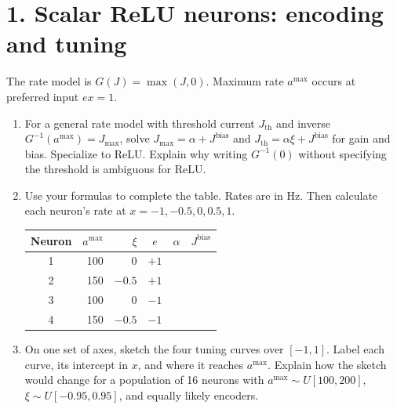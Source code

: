 \documentclass[11pt,letterpaper]{article}
\begin{document}
\section*{1. Scalar ReLU neurons: encoding and tuning}
The rate model is \(G(J)=\max(J,0)\). Maximum rate \(a^{\max}\) occurs at preferred input \(e x=1\).
\begin{enumerate}[label=\textbf{1\alph*.}]
\item For a general rate model with threshold current \(J_{\mathrm{th}}\) and inverse \(G^{-1}(a^{\max})=J_{\max}\), solve \(J_{\max}=\alpha+J^{\mathrm{bias}}\) and \(J_{\mathrm{th}}=\alpha\xi+J^{\mathrm{bias}}\) for gain and bias. Specialize to ReLU. Explain why writing \(G^{-1}(0)\) without specifying the threshold is ambiguous for ReLU.
\item Use your formulas to complete the table. Rates are in Hz. Then calculate each neuron's rate at \(x=-1,-0.5,0,0.5,1\).
\begin{center}\begin{tabular}{c r r c c c}\toprule
Neuron & \(a^{\max}\) & \(\xi\) & \(e\) & \(\alpha\) & \(J^{\mathrm{bias}}\)\\\midrule
1 & 100 & 0 & \(+1\) & & \\
2 & 150 & \(-0.5\) & \(+1\) & & \\
3 & 100 & 0 & \(-1\) & & \\
4 & 150 & \(-0.5\) & \(-1\) & & \\
\bottomrule\end{tabular}\end{center}
\item On one set of axes, sketch the four tuning curves over \([-1,1]\). Label each curve, its intercept in \(x\), and where it reaches \(a^{\max}\). Explain how the sketch would change for a population of 16 neurons with \(a^{\max}\sim U[100,200]\), \(\xi\sim U[-0.95,0.95]\), and equally likely encoders.\par
\end{enumerate}
\end{document}

